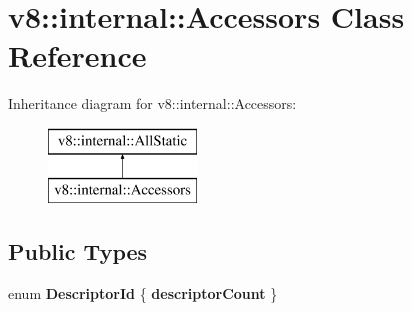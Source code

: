 \hypertarget{classv8_1_1internal_1_1_accessors}{}\section{v8\+:\+:internal\+:\+:Accessors Class Reference}
\label{classv8_1_1internal_1_1_accessors}
Inheritance diagram for v8\+:\+:internal\+:\+:Accessors\+:\begin{figure}[H]
\begin{center}
\leavevmode
\includegraphics[height=2.000000cm]{classv8_1_1internal_1_1_accessors}
\end{center}
\end{figure}
\subsection*{Public Types}
\begin{DoxyCompactItemize}
\item 
enum {\bfseries Descriptor\+Id} \{ {\bfseries descriptor\+Count}
 \}\hypertarget{classv8_1_1internal_1_1_accessors_a1c466e7b9e4df52b9cd44f01d41faf3b}{}\label{classv8_1_1internal_1_1_accessors_a1c466e7b9e4df52b9cd44f01d41faf3b}

\end{DoxyCompactItemize}
